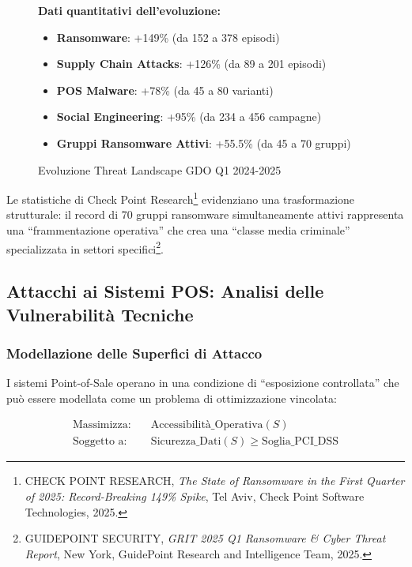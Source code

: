 \begin{figure}[htbp]
\centering
\caption{Evoluzione Threat Landscape GDO Q1 2024-2025}
\label{fig:evoluzione-threat-landscape}
\begin{minipage}{0.8\textwidth}
\footnotesize
\textbf{Dati quantitativi dell'evoluzione:}
\begin{itemize}
    \item \textbf{Ransomware}: +149\% (da 152 a 378 episodi)
    \item \textbf{Supply Chain Attacks}: +126\% (da 89 a 201 episodi)
    \item \textbf{POS Malware}: +78\% (da 45 a 80 varianti)
    \item \textbf{Social Engineering}: +95\% (da 234 a 456 campagne)
    \item \textbf{Gruppi Ransomware Attivi}: +55.5\% (da 45 a 70 gruppi)
\end{itemize}
\end{minipage}
\end{figure}

Le statistiche di Check Point Research\footnote{CHECK POINT RESEARCH, \textit{The State of Ransomware in the First Quarter of 2025: Record-Breaking 149\% Spike}, Tel Aviv, Check Point Software Technologies, 2025.} evidenziano una trasformazione strutturale: il record di 70 gruppi ransomware simultaneamente attivi rappresenta una ``frammentazione operativa'' che crea una ``classe media criminale'' specializzata in settori specifici\footnote{GUIDEPOINT SECURITY, \textit{GRIT 2025 Q1 Ransomware \& Cyber Threat Report}, New York, GuidePoint Research and Intelligence Team, 2025.}.

\subsection{Attacchi ai Sistemi POS: Analisi delle Vulnerabilità Tecniche}
\label{subsec:attacchi-sistemi-pos}

\subsubsection{Modellazione delle Superfici di Attacco}

I sistemi Point-of-Sale operano in una condizione di ``esposizione controllata'' che può essere modellata come un problema di ottimizzazione vincolata:

\begin{align}
\text{Massimizza:} \quad & \text{Accessibilità\_Operativa}(S) \label{eq:ottimizzazione-pos-obj} \\
\text{Soggetto a:} \quad & \text{Sicurezza\_Dati}(S) \geq \text{Soglia\_PCI\_DSS} \nonumber
\end{align}

